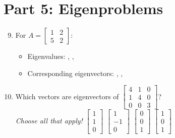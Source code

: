 \documentclass{article}
\begin{document}
\newpage

\section*{Part 5: Eigenproblems}
\begin{enumerate}
	\setcounter{enumi}{8}
	\item For $A = \begin{bmatrix} 1 & 2 \\ 5 & 2 \end{bmatrix}$:
	\begin{itemize}
		\item Eigenvalues: \underline{\hspace{1cm}}, \underline{\hspace{1cm}}, \underline{\hspace{1cm}}
		\item Corresponding eigenvectors: \underline{\hspace{3cm}}, \underline{\hspace{3cm}}, \underline{\hspace{3cm}}
	\end{itemize}
	
	\item Which vectors are eigenvectors of $\begin{bmatrix} 4 & 1 & 0 \\ 1 & 4 & 0 \\ 0 & 0 & 3 \end{bmatrix}$? \\ 
	\textit{Choose all that apply!}
	\bigskip
	$\begin{bmatrix} 1 \\ 1 \\ 0 \end{bmatrix}$ \hspace{0.5cm} 
	$\begin{bmatrix} 1 \\ -1 \\ 0 \end{bmatrix}$ \hspace{0.5cm} 
	$\begin{bmatrix} 0 \\ 0 \\ 1 \end{bmatrix}$ \hspace{0.5cm} 
	$\begin{bmatrix} 1 \\ 0 \\ 1 \end{bmatrix}$
\end{enumerate}
\end{document}
